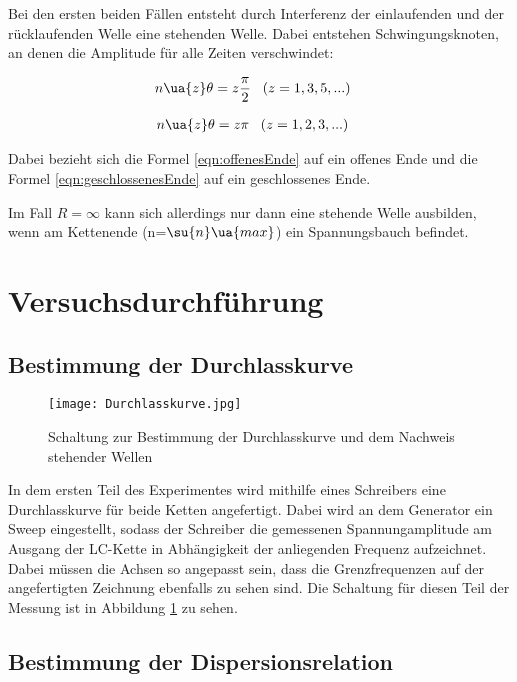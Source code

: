 Bei den ersten beiden Fällen entsteht durch Interferenz der einlaufenden
und der rücklaufenden Welle eine stehenden Welle.
Dabei entstehen Schwingungsknoten, an denen die Amplitude für alle
Zeiten verschwindet:

\begin{align}
  n\ua{z}\theta &= z \frac{\pi}{2} \, \, \, \, \, (z = 1,3,5, ...)
  \label{eqn:offenesEnde}
\end{align}

\begin{align}
  n\ua{z}\theta &= z \pi \, \, \, \, \, (z = 1,2,3, ...)
  \label{eqn:geschlossenesEnde}
\end{align}

Dabei bezieht sich die Formel \eqref{eqn:offenesEnde} auf ein offenes Ende und
die Formel \eqref{eqn:geschlossenesEnde} auf ein geschlossenes Ende.

Im Fall $R = \infty$ kann sich allerdings nur dann eine stehende Welle ausbilden,
wenn am Kettenende (n=$\su{n}\ua{max}$) ein Spannungsbauch befindet.

\newpage

\section{Versuchsdurchführung}

\subsection{Bestimmung der Durchlasskurve}

\begin{figure}
  \texttt{[image: Durchlasskurve.jpg]}
  \caption{Schaltung zur Bestimmung der Durchlasskurve und dem Nachweis stehender Wellen \cite{anleitung01}}
  \label{fig:Durchlasskurve}
\end{figure}

In dem ersten Teil des Experimentes wird mithilfe eines Schreibers eine Durchlasskurve
für beide Ketten angefertigt. Dabei wird an dem Generator ein Sweep eingestellt,
sodass der Schreiber die gemessenen Spannungamplitude am Ausgang der LC-Kette in Abhängigkeit
der anliegenden Frequenz aufzeichnet. Dabei müssen die Achsen so angepasst sein,
dass die Grenzfrequenzen auf der angefertigten Zeichnung ebenfalls zu sehen sind.
Die Schaltung für diesen Teil der Messung ist in Abbildung \ref{fig:Durchlasskurve}
zu sehen.


\subsection{Bestimmung der Dispersionsrelation}

